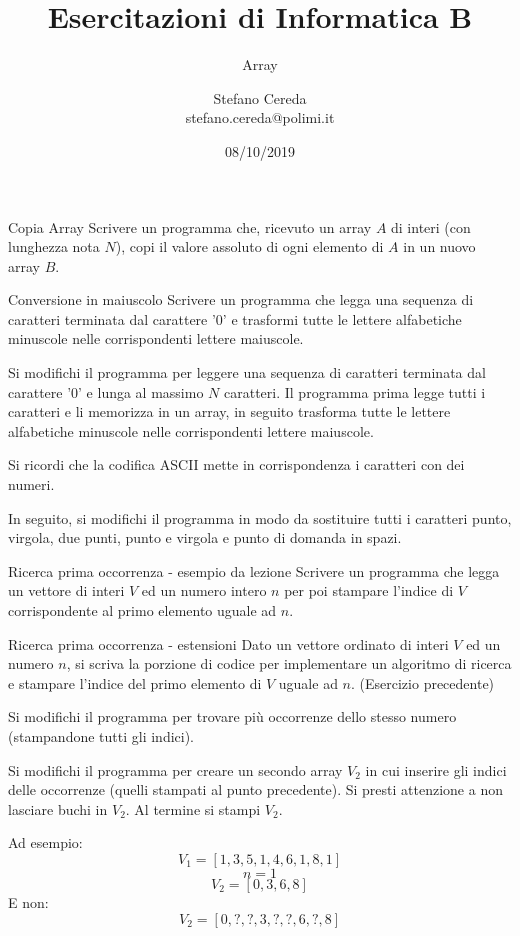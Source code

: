 \documentclass[aspectratio=169, ]{beamer}
\title{Esercitazioni di Informatica B}
\subtitle{Array}
\author{Stefano Cereda\\
	stefano.cereda@polimi.it
}
\date{08/10/2019}
\begin{document}
\begin{frame}
    \maketitle
\end{frame}


\begin{frame}{Copia Array}
Scrivere un programma che, ricevuto un array $A$ di interi (con lunghezza nota $N$), copi il valore assoluto di ogni elemento di $A$ in un nuovo array $B$.
\end{frame}

\begin{frame}{Conversione in maiuscolo}
Scrivere un programma che legga una sequenza di caratteri terminata dal carattere '0' e trasformi tutte le lettere
    alfabetiche minuscole nelle corrispondenti lettere maiuscole.

Si modifichi il programma per leggere una sequenza di caratteri terminata dal carattere '0' e lunga al massimo $N$
    caratteri.
Il programma prima legge tutti i caratteri e li memorizza in un array, in seguito trasforma tutte le lettere alfabetiche
    minuscole nelle corrispondenti lettere maiuscole.

Si ricordi che la codifica ASCII mette in corrispondenza i caratteri con dei numeri.

In seguito, si modifichi il programma in modo da sostituire tutti i caratteri punto, virgola, due punti, punto e virgola e punto di domanda in spazi.
\end{frame}

\begin{frame}{Ricerca prima occorrenza - esempio da lezione}
Scrivere un programma che legga un vettore di interi $V$ ed un numero intero $n$ per poi stampare l'indice di $V$ corrispondente al primo elemento uguale ad $n$.
\end{frame}

\begin{frame}{Ricerca prima occorrenza - estensioni}
\footnotesize
Dato un vettore ordinato di interi $V$ ed un numero $n$, si scriva la porzione di codice per implementare un algoritmo di ricerca e stampare l'indice del primo elemento di $V$ uguale ad $n$. (Esercizio precedente)

Si modifichi il programma per trovare più occorrenze dello stesso numero (stampandone tutti gli indici).

\pause
Si modifichi il programma per creare un secondo array $V_2$ in cui inserire gli indici delle occorrenze (quelli stampati al punto precedente). Si presti attenzione a non lasciare buchi in $V_2$. Al termine si stampi $V_2$.

\pause
Ad esempio:
\[ V_1 = [1, 3, 5, 1, 4, 6, 1, 8, 1] \]
\[ n=1 \]
\[ V_2 = [0, 3, 6, 8]\]
E non:
\[ V_2 = [0, ?, ?, 3, ?, ?, 6, ?, 8]\]
\end{frame}
\end{document}
